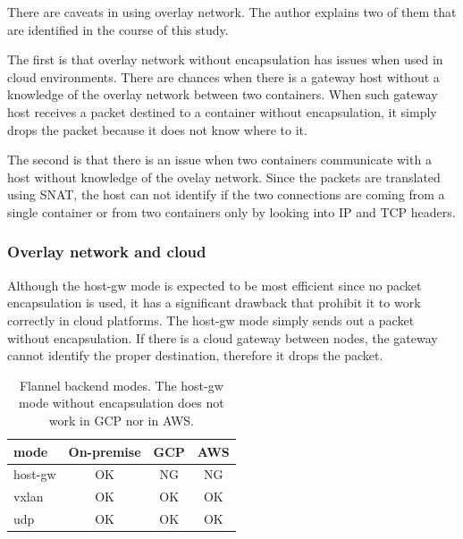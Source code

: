 There are caveats in using overlay network.
The author explains two of them that are identified in the course of this study.


  The first  is that overlay network without encapsulation has issues when used in cloud environments.
  There are chances when there is a gateway host without a knowledge of the overlay network between two containers.
  When such  gateway host receives a packet destined to a container without encapsulation, it simply drops the packet because it does not know where to  it.

  The second  is that there is an issue when two containers communicate with a host without knowledge of the ovelay network.
  Since the packets are translated using SNAT, the host can not identify if the two connections are coming from a single container or from two containers only by looking into IP and TCP headers.


\subsubsection{Overlay network and cloud}

Although the host-gw mode is expected to be most efficient since no packet encapsulation is used, it has a significant drawback that prohibit it to work correctly in cloud platforms. 
The host-gw mode simply sends out a packet without encapsulation.
If there is a cloud gateway between nodes, the gateway cannot identify the proper destination, therefore it drops the packet.

\begin{table}
  \centering
  \begin{tabular}{lccc}
    \toprule
    mode & On-premise & GCP & AWS \\
    \midrule
    host-gw & OK & NG & NG \\
    vxlan & OK & OK & OK \\
    udp & OK & OK & OK \\
    \bottomrule
  \end{tabular}

  \par\bigskip
  \centering
  \begin{minipage}{0.9\columnwidth}
    \caption[Flannel backend modes]{
      Flannel backend modes.
      The host-gw mode without encapsulation does not work in GCP nor in AWS.
    }
    \label{tab:Viable flannel backends}
  \end{minipage}
\end{table}

